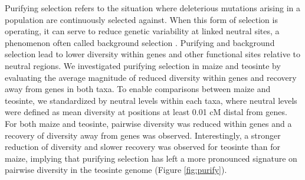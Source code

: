 \documentclass{pnastwo}
\begin{document}
\begin{article}
Purifying selection refers to the situation where deleterious mutations arising in a population are continuously selected against.
When this form of selection is operating, it can serve to reduce genetic variability at linked neutral sites, a phenomenon often called background selection \cite{charlesworth1993}. Purifying and background selection lead to lower diversity within genes and other functional sites relative to neutral regions.
We investigated purifying selection in maize and teosinte by evaluating the average magnitude of reduced diversity within genes and recovery away from genes in both taxa.
To enable comparisons between maize and teosinte, we standardized by neutral levels within each taxa, where neutral levels were defined as mean diversity at positions at least 0.01 cM distal from genes. For both maize and teosinte, pairwise diversity was reduced within genes and a recovery of diversity away from genes was observed. Interestingly, a stronger reduction of diversity and slower recovery was observed for teosinte than for maize, implying that purifying selection has left a more pronounced signature on pairwise diversity in the teosinte genome (Figure \ref{fig:purify}).




\end{article}
\end{document}

